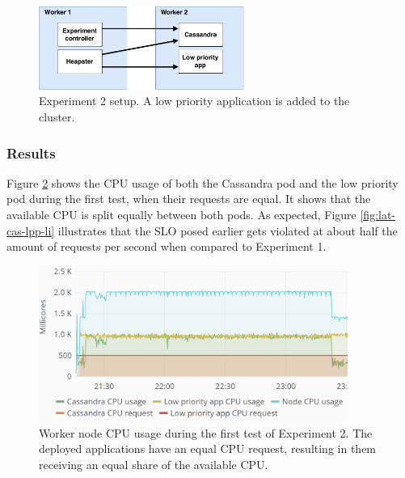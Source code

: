 \setlength\abovecaptionskip{3pt}
\begin{figure}[h]
\centering
\includegraphics[width=0.60\textwidth]{Images/Experiments/Experiment_2.pdf}
\caption{Experiment 2 setup. A low priority application is added to the cluster.}
\label{fig:experiment2}
\end{figure}

\subsubsection{Results}
Figure \ref{fig:cpu-cas-lpp-li} shows the CPU usage of both the Cassandra pod and the low priority pod during the first test, when their requests are equal. It shows that the available CPU is split equally between both pods. As expected, Figure \ref{fig:lat-cas-lpp-li} illustrates that the SLO posed earlier gets violated at about half the amount of requests per second when compared to Experiment 1. \\

\begin{figure}[h]
\centering
\includegraphics[width=0.90\textwidth]{Images/Experiments/CPU/Grafana/cpu-cas-lpp-li.PNG}
\caption{Worker node CPU usage during the first test of Experiment 2. The deployed applications have an equal CPU request, resulting in them receiving an equal share of the available CPU.}
\label{fig:cpu-cas-lpp-li}
\end{figure}

